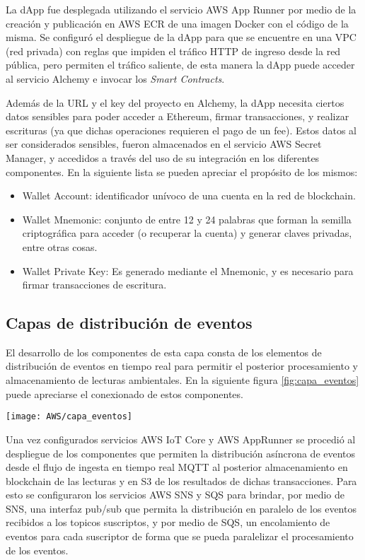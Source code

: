 La dApp fue desplegada utilizando el servicio AWS App Runner por medio de la creación y publicación en AWS ECR de una imagen Docker con el código de la misma. Se configuró el despliegue de la dApp para que se encuentre en una VPC (red privada) con reglas que impiden el tráfico HTTP de ingreso desde la red pública, pero permiten el tráfico saliente, de esta manera la dApp puede acceder al servicio Alchemy e invocar los \textit{Smart Contracts}.

Además de la URL y el key del proyecto en Alchemy, la dApp necesita ciertos datos sensibles para poder acceder a Ethereum, firmar transacciones, y realizar escrituras (ya que dichas operaciones requieren el pago de un fee). Estos datos al ser considerados sensibles, fueron almacenados en el servicio AWS Secret Manager, y accedidos a través del uso de su integración en los diferentes componentes. En la siguiente lista se pueden apreciar el propósito de los mismos:

\begin{itemize}
	\item Wallet Account: identificador unívoco de una cuenta en la red de blockchain.
	\item Wallet Mnemonic: conjunto de entre 12 y 24 palabras que forman la semilla criptográfica para acceder (o recuperar la cuenta) y generar claves privadas, entre otras cosas.
	\item Wallet Private Key: Es generado mediante el Mnemonic, y es necesario para firmar transacciones de escritura.
\end{itemize}


\subsection{Capas de distribución de eventos}

El desarrollo de los componentes de esta capa consta de los elementos de distribución de eventos en tiempo real para permitir el posterior procesamiento y almacenamiento de lecturas ambientales. En la siguiente figura \ref{fig:capa_eventos} puede apreciarse el conexionado de estos componentes.


\begin{center}
   \texttt{[image: AWS/capa\_eventos]}
   \label{fig:capa_eventos}
\end{center}


Una vez configurados servicios AWS IoT Core y AWS AppRunner se procedió al despliegue de los componentes que permiten la distribución asíncrona de eventos desde el flujo de ingesta en tiempo real MQTT al posterior almacenamiento en blockchain de las lecturas y en S3 de los resultados de dichas transacciones. Para esto se configuraron los servicios AWS SNS y SQS para brindar, por medio de SNS, una interfaz pub/sub que permita la distribución en paralelo de los eventos recibidos a los topicos suscriptos, y por medio de SQS, un encolamiento de eventos para cada suscriptor de forma que se pueda paralelizar el procesamiento de los eventos.

